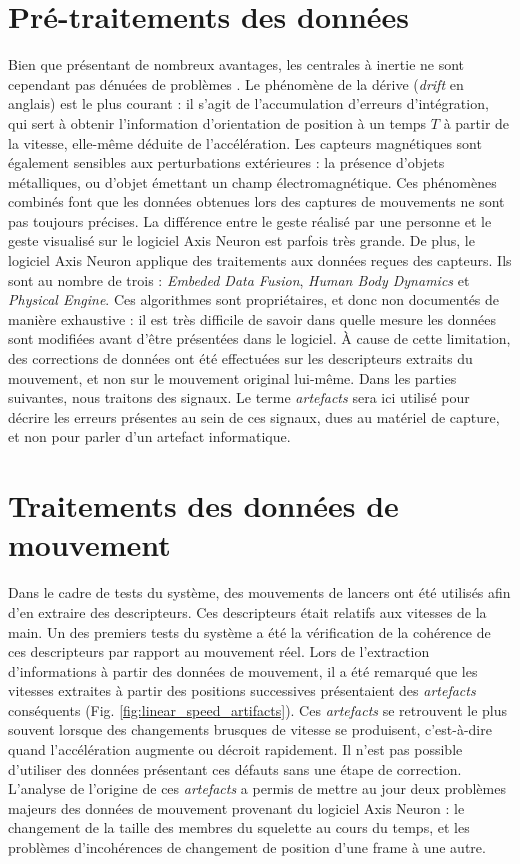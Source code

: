 \section{Pré-traitements des données}
Bien que présentant de nombreux avantages, les centrales à inertie ne sont cependant pas dénuées de problèmes \parencite{Giansanti2003Iif}. Le phénomène de la dérive (\textit{drift} en anglais) est le plus courant : il s'agit de l'accumulation d'erreurs d'intégration, qui sert à obtenir l'information d'orientation de position à un temps $T$ à partir de la vitesse, elle-même déduite de l'accélération. Les capteurs magnétiques sont également sensibles aux perturbations extérieures : la présence d'objets métalliques, ou d'objet émettant un champ électromagnétique. Ces phénomènes combinés font que les données obtenues lors des captures de mouvements ne sont pas toujours précises. La différence entre le geste réalisé par une personne et le geste visualisé sur le logiciel Axis Neuron est parfois très grande. De plus, le logiciel Axis Neuron applique des traitements aux données reçues des capteurs. Ils sont au nombre de trois : \textit{Embeded Data Fusion}, \textit{Human Body Dynamics} et \textit{Physical Engine}. Ces algorithmes sont propriétaires, et donc non documentés de manière exhaustive : il est très difficile de savoir dans quelle mesure les données sont modifiées avant d'être présentées dans le logiciel. À cause de cette limitation, des corrections de données ont été effectuées sur les descripteurs extraits du mouvement, et non sur le mouvement original lui-même. Dans les parties suivantes, nous traitons des signaux. Le terme \textit{artefacts} sera ici utilisé pour décrire les erreurs présentes au sein de ces signaux, dues au matériel de capture, et non pour parler d'un artefact informatique.

\section{Traitements des données de mouvement}\label{sec:traitements}
Dans le cadre de tests du système, des mouvements de lancers ont été utilisés afin d'en extraire des descripteurs. Ces descripteurs était relatifs aux vitesses de la main. Un des premiers tests du système a été la vérification de la cohérence de ces descripteurs par rapport au mouvement réel. Lors de l'extraction d'informations à partir des données de mouvement, il a été remarqué que les vitesses extraites à partir des positions successives présentaient des \textit{artefacts} conséquents (Fig. \ref{fig:linear_speed_artifacts}). Ces \textit{artefacts} se retrouvent le plus souvent lorsque des changements brusques de vitesse se produisent, c'est-à-dire quand l'accélération augmente ou décroit rapidement. Il n'est pas possible d'utiliser des données présentant ces défauts sans une étape de correction. L'analyse de l'origine de ces \textit{artefacts} a permis de mettre au jour deux problèmes majeurs des données de mouvement provenant du logiciel Axis Neuron : le changement de la taille des membres du squelette au cours du temps, et les problèmes d'incohérences de changement de position d'une frame à une autre.

